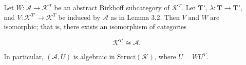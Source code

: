 Let $W: \mathcal{A} \longrightarrow \mathcal{K}^T$ be an abstract Birkhoff subcategory of $\mathcal{K}^T$. Let $\mathbf{T}'$, $\lambda: \mathbf{T} \longrightarrow \mathbf{T}'$, and $V: \mathcal{K}^{T'} \longrightarrow \mathcal{K}^T$ be induced by $\mathcal{A}$ as in Lemma 3.2. Then $V$ and $W$ are isomorphic; that is, there exists an isomorphism of categories

$$\mathcal{K}^{T'} \cong \mathcal{A}.$$

In particular, $(\mathcal{A}, U)$ is algebraic in $\text{Struct}(\mathcal{K})$, where $U = WU^T$.
